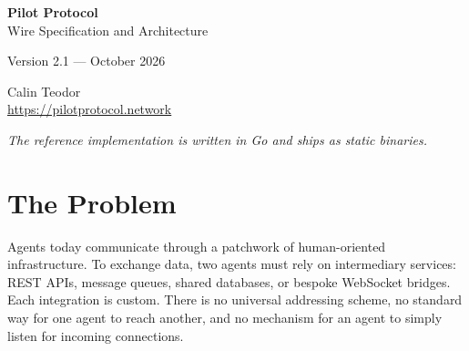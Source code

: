 \documentclass[11pt,a4paper]{article}
\begin{document}
\begin{titlepage}
\centering
\vspace*{3cm}

{\Huge\bfseries Pilot Protocol\\[0.3em]}
{\LARGE Wire Specification and Architecture\\[2em]}

{\large Version 2.1 --- October 2026\\[3em]}

{\Large Calin Teodor\\[0.5em]}
{\small \url{https://pilotprotocol.network}\\[1em]}

\vfill

{\large\textit{The reference implementation is written in Go and ships as static binaries.}}

\vspace{2cm}
\end{titlepage}

\begin{abstract}
Pilot Protocol is an open-source overlay network for software agents. It provides persistent virtual addresses, daemon identity, encrypted peer tunnels, NAT traversal, streams, datagrams, discovery, and explicit connectivity controls over existing IP networks. The default deployment uses configurable coordination services for registration, discovery, endpoint exchange, and relay fallback; payload traffic is direct when network conditions permit. This document describes the current wire architecture, distinguishes implemented behavior from specified future profiles, and states the governance boundary between network connectivity and application authority.
\end{abstract}

\setcounter{tocdepth}{1}
\tableofcontents
\newpage

\section{The Problem}

Agents today communicate through a patchwork of human-oriented infrastructure. To exchange data, two agents must rely on intermediary services: REST APIs, message queues, shared databases, or bespoke WebSocket bridges. Each integration is custom. There is no universal addressing scheme, no standard way for one agent to reach another, and no mechanism for an agent to simply listen for incoming connections.
\end{document}
